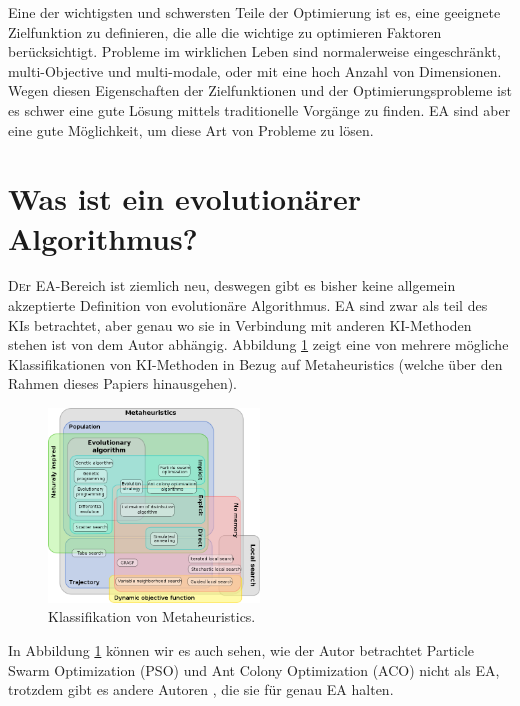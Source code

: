 \documentclass[twoside,twocolumn]{article}
\begin{document}
Eine der wichtigsten und schwersten Teile der Optimierung ist es, eine geeignete Zielfunktion zu definieren, die alle die wichtige zu optimieren Faktoren berücksichtigt.
Probleme im wirklichen Leben sind normalerweise eingeschränkt, multi-Objective und multi-modale, oder mit eine hoch Anzahl von Dimensionen. Wegen diesen Eigenschaften der Zielfunktionen und der Optimierungsprobleme ist es schwer eine gute Lösung mittels traditionelle Vorgänge  zu finden. EA sind aber eine gute Möglichkeit, um diese Art von Probleme zu lösen.


\section{Was ist ein evolutionärer Algorithmus?}

\lettrine[nindent=0em,lines=3]{D} er EA-Bereich ist ziemlich neu, deswegen gibt es bisher keine allgemein akzeptierte Definition von evolutionäre Algorithmus. EA sind zwar als teil des KIs betrachtet, aber genau wo sie in Verbindung mit anderen KI-Methoden stehen ist von dem Autor abhängig. Abbildung \ref{fig:metaheuristics} zeigt eine von mehrere mögliche Klassifikationen von KI-Methoden in Bezug auf Metaheuristics (welche über den Rahmen dieses Papiers hinausgehen).\\

\begin{figure}[h]
\caption{ Klassifikation von Metaheuristics.}
\label{fig:metaheuristics}
\centering
\includegraphics[width=0.5\textwidth]{images/metaheuristics_classification.png}
\end{figure}

In Abbildung \ref{fig:metaheuristics} können wir es auch sehen, wie der Autor betrachtet Particle Swarm Optimization (PSO) und Ant Colony Optimization (ACO) nicht als EA, trotzdem gibt es andere Autoren \cite{wiley_evolutionary}, die sie für genau EA halten.
\end{document}
